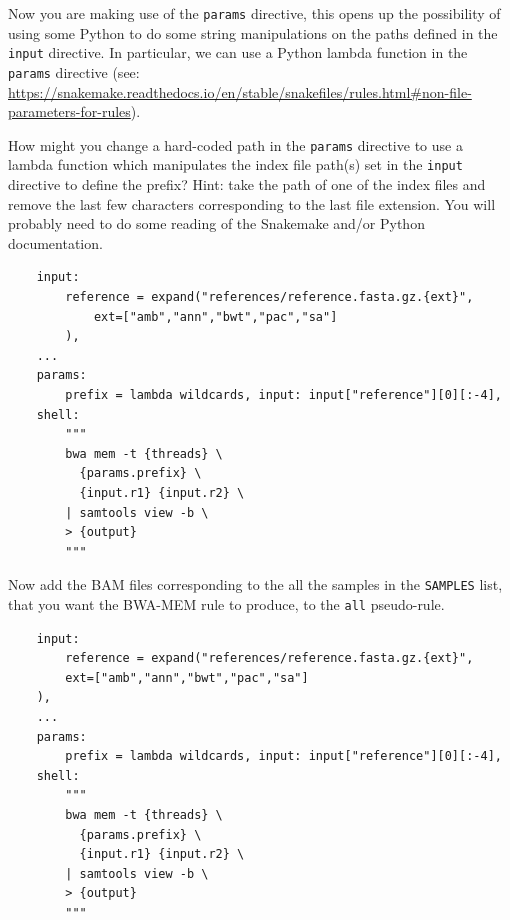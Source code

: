 \begin{questions}

Now you are making use of the \texttt{params} directive, this opens up the possibility of using some Python to do some string manipulations
on the paths defined in the \texttt{input} directive. In particular, we can use a Python lambda function in the \texttt{params} directive
(see: \url{https://snakemake.readthedocs.io/en/stable/snakefiles/rules.html#non-file-parameters-for-rules}).

How might you change a hard-coded path in the \texttt{params} directive to use a lambda function which manipulates the index file path(s) set
in the \texttt{input} directive to define the prefix? Hint: take the path of one of the index files and remove the last few characters
corresponding to the last file extension. You will probably need to do some reading of the Snakemake and/or Python documentation.

\begin{answer}

\begin{lstlisting}
	input:
		reference = expand("references/reference.fasta.gz.{ext}",
			ext=["amb","ann","bwt","pac","sa"]
		),
	...
	params:
		prefix = lambda wildcards, input: input["reference"][0][:-4],
	shell:
		"""
		bwa mem -t {threads} \
		  {params.prefix} \
		  {input.r1} {input.r2} \
		| samtools view -b \
		> {output}
		"""
\end{lstlisting}

\end{answer}

Now add the BAM files corresponding to the all the samples in the \texttt{SAMPLES} list, that you want the BWA-MEM rule to produce, to the
\texttt{all} pseudo-rule.

\begin{answer}

\begin{lstlisting}
	input:
		reference = expand("references/reference.fasta.gz.{ext}",
		ext=["amb","ann","bwt","pac","sa"]
	),
	...
	params:
		prefix = lambda wildcards, input: input["reference"][0][:-4],
	shell:
		"""
		bwa mem -t {threads} \
		  {params.prefix} \
		  {input.r1} {input.r2} \
		| samtools view -b \
		> {output}
		"""
\end{lstlisting}

\end{answer}

\end{questions}

